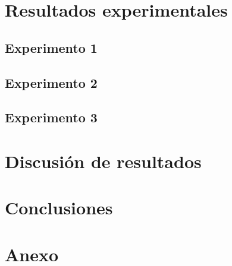 \documentclass[12pt, titlepage]{article}
\begin{document}
\section{Resultados experimentales}
\subsection{Experimento 1}
\subsection{Experimento 2}
\subsection{Experimento 3}
\section{Discusión de resultados}
\section{Conclusiones}


\section{Anexo}
\end{document}
